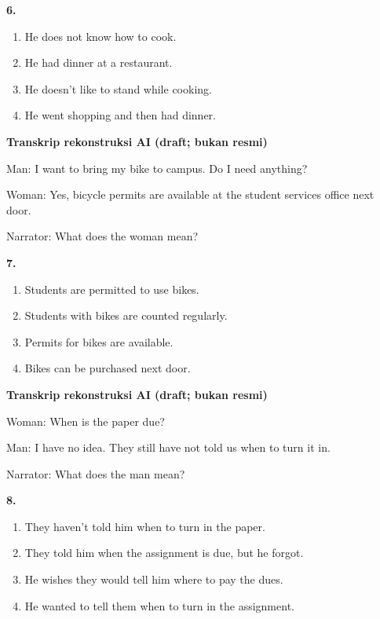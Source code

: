 \documentclass[12pt]{article}
\begin{document}
\noindent\textbf{6.}
\begin{enumerate}[label=(\Alph*),leftmargin=*,itemsep=0.2em]
\item He does not know how to cook.
\item He had dinner at a restaurant.
\item He doesn't like to stand while cooking.
\item He went shopping and then had dinner.
\end{enumerate}
\par
\vspace{0.25\baselineskip}
\begin{exampleblock}
\textbf{Transkrip rekonstruksi AI (draft; bukan resmi)}\par
Man: I want to bring my bike to campus. Do I need anything?\par
Woman: Yes, bicycle permits are available at the student services office next door.\par
Narrator: What does the woman mean?\par
\end{exampleblock}
\noindent\textbf{7.}
\begin{enumerate}[label=(\Alph*),leftmargin=*,itemsep=0.2em]
\item Students are permitted to use bikes.
\item Students with bikes are counted regularly.
\item Permits for bikes are available.
\item Bikes can be purchased next door.
\end{enumerate}
\par
\vspace{0.25\baselineskip}
\begin{exampleblock}
\textbf{Transkrip rekonstruksi AI (draft; bukan resmi)}\par
Woman: When is the paper due?\par
Man: I have no idea. They still have not told us when to turn it in.\par
Narrator: What does the man mean?\par
\end{exampleblock}
\noindent\textbf{8.}
\begin{enumerate}[label=(\Alph*),leftmargin=*,itemsep=0.2em]
\item They haven't told him when to turn in the paper.
\item They told him when the assignment is due, but he forgot.
\item He wishes they would tell him where to pay the dues.
\item He wanted to tell them when to turn in the assignment.
\end{enumerate}
\end{document}
